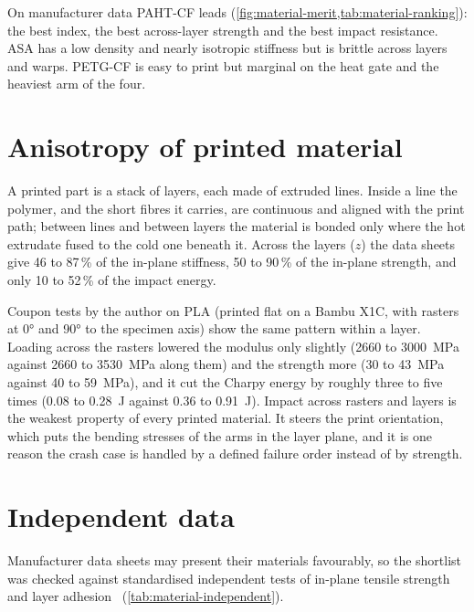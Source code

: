 On manufacturer data PAHT-CF leads (\cref{fig:material-merit,tab:material-ranking}): the best index, the best across-layer strength and the best impact resistance. ASA has a low density and nearly isotropic stiffness but is brittle across layers and warps. PETG-CF is easy to print but marginal on the heat gate and the heaviest arm of the four.

\section{Anisotropy of printed material}\label{sec:material-anisotropy}

A printed part is a stack of layers, each made of extruded lines. Inside a line the polymer, and the short fibres it carries, are continuous and aligned with the print path; between lines and between layers the material is bonded only where the hot extrudate fused to the cold one beneath it. Across the layers ($z$) the data sheets give 46 to 87\,\% of the in-plane stiffness, 50 to 90\,\% of the in-plane strength, and only 10 to 52\,\% of the impact energy.

Coupon tests by the author on PLA (printed flat on a Bambu X1C, with rasters at \ang{0} and \ang{90} to the specimen axis) show the same pattern within a layer. Loading across the rasters lowered the modulus only slightly (2660 to \SI{3000}{MPa} against 2660 to \SI{3530}{MPa} along them) and the strength more (30 to \SI{43}{MPa} against 40 to \SI{59}{MPa}), and it cut the Charpy energy by roughly three to five times (0.08 to \SI{0.28}{J} against 0.36 to \SI{0.91}{J}). Impact across rasters and layers is the weakest property of every printed material. It steers the print orientation, which puts the bending stresses of the arms in the layer plane, and it is one reason the crash case is handled by a defined failure order instead of by strength.

\section{Independent data}\label{sec:material-independent}

Manufacturer data sheets may present their materials favourably, so the shortlist was checked against standardised independent tests of in-plane tensile strength and layer adhesion~\citep{mytechfun_siraya} (\cref{tab:material-independent}).

